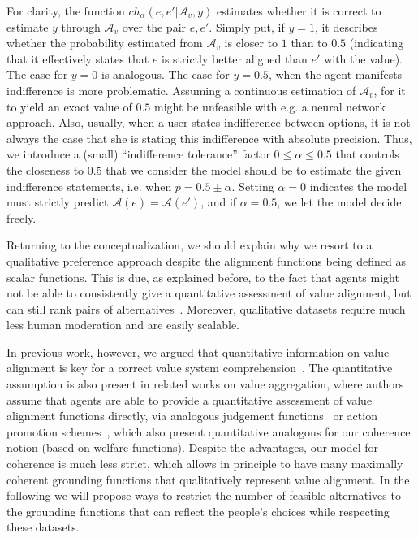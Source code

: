 \documentclass{ecai}
\newcommand{\A}{\mathcal{A}}
\begin{document}
For clarity, the function $ch_\alpha(e,e'|\A_v,y)$ estimates whether it is correct to estimate $y$ through $\A_v$ over the pair $e,e'$. Simply put, if $y=1$, it describes whether the probability estimated from $\A_v$ is closer to $1$ than to $0.5$ (indicating that it effectively states that $e$ is strictly better aligned than $e'$ with the value). The case for $y=0$ is analogous. The case for $y=0.5$, when the agent manifests indifference is more problematic. Assuming a continuous estimation of $\A_v$, for it to yield an exact value of $0.5$ might be unfeasible with e.g. a neural network approach. Also, usually, when a user states indifference between options, it is not always the case that she is stating this indifference with absolute precision. Thus, we introduce a (small) ``indifference tolerance'' factor $0\leq \alpha\leq0.5$ that controls the closeness to $0.5$ that we consider the model should be to estimate the given indifference statements, i.e. when $p = 0.5\pm\alpha$. Setting $\alpha = 0$ indicates the model must strictly predict $\A(e) = \A(e')$, and if $\alpha=0.5$, we let the model decide freely.

Returning to the conceptualization, we should explain why we resort to a qualitative preference approach despite the alignment functions being defined as scalar functions. This is due, as explained before, to the fact that agents might not be able to consistently give a quantitative assessment of value alignment, but can still rank pairs of alternatives~\cite{Serramia2020valuesystem}. Moreover, qualitative datasets require much less human moderation and are easily scalable.

In previous work, however, we argued that quantitative information on value alignment is key for a correct value system comprehension~\cite{andres2024vecompPaper}. The quantitative assumption is also present in related works on value aggregation, where authors assume that agents are able to provide a quantitative assessment of value alignment functions directly, via analogous judgement functions~\cite{Serramia2018} or action promotion schemes~\cite{Karanik2024}, which also present quantitative analogous for our coherence notion (based on welfare functions). Despite the advantages, our model for coherence is much less strict, which allows in principle to have many maximally coherent grounding functions that qualitatively represent value alignment. In the following we will propose ways to restrict the number of feasible alternatives to the grounding functions that can reflect the people's choices while respecting these datasets.
\end{document}
